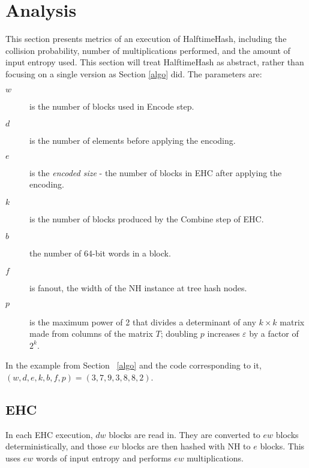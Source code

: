 \documentclass[runningheads]{llncs}
\begin{document}


\section{Analysis}
\label{analysis}

This section presents metrics of an execution of HalftimeHash, including the collision probability, number of multiplications performed, and the amount of input entropy used.
This section will treat HalftimeHash as abstract, rather than focusing on a single version as Section \ref{algo} did.
The parameters are:

\begin {description}
\item[$w$] is the number of blocks used in Encode step.
\item[$d$] is the number of elements before applying the encoding.
\item[$e$] is the {\em encoded size} - the number of blocks in EHC after applying the encoding.
\item[$k$] is the number of blocks produced by the Combine step of EHC.
\item[$b$] the number of 64-bit words in a block.
\item[$f$] is fanout, the width of the NH instance at tree hash nodes.
\item[$p$] is the maximum power of 2 that divides a determinant of any $k \times k$ matrix made from columns of the matrix $T$; doubling $p$ increases $\varepsilon$ by a factor of $2^k$.
\end{description}

In the example from Section ~\ref{algo} and the code corresponding to it, $(w,d,e,k,b,f,p) = (3,7,9,3,8,8,2)$.

\subsection{EHC}

In each EHC execution, $d w$ blocks are read in.
They are converted to $e w$ blocks deterministically, and those $e w$ blocks are then hashed with NH to $e$ blocks.
This uses $e w$ words of input entropy and performs $e w$ multiplications.
\end{document}
